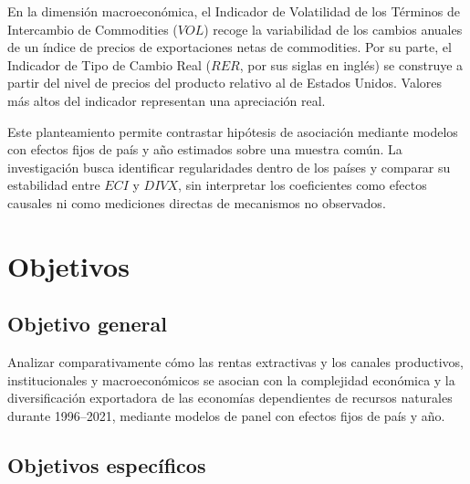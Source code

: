 \documentclass[../../TFM.tex]{subfiles}
\begin{document}
	En la dimensión macroeconómica, el Indicador de Volatilidad de los Términos
	de Intercambio de Commodities ($VOL$) recoge la variabilidad de los cambios
	anuales de un índice de precios de exportaciones netas de commodities.
	Por su parte, el Indicador de Tipo de Cambio Real
	($RER$, por sus siglas en inglés) se construye a partir del nivel de precios
	del producto relativo al de Estados Unidos. Valores más altos del indicador
	representan una apreciación real.

	Este planteamiento permite contrastar hipótesis de asociación mediante modelos con efectos fijos de país y año estimados sobre una muestra común. La investigación busca identificar regularidades dentro de los países y comparar su estabilidad entre $ECI$ y $DIVX$, sin interpretar los coeficientes como efectos causales ni como mediciones directas de mecanismos no observados.


	\chapter{Objetivos}
	\label{chap:objetivos}

	\section{Objetivo general}
	\label{sec:objetivo-general}



	Analizar comparativamente cómo las rentas extractivas y los canales
	productivos, institucionales y macroeconómicos se asocian con la complejidad
	económica y la diversificación exportadora de las economías dependientes de
	recursos naturales durante 1996--2021, mediante modelos de panel con efectos
	fijos de país y año.



	\section{Objetivos específicos}

	\label{sec:objetivos-especificos}
\end{document}
